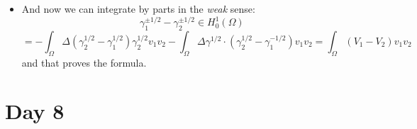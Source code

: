 \documentclass{article}
\begin{document}
\begin{itemize}
\begin{itemize}
        \item And now we can integrate by parts in the \textit{weak} sense:
        \begin{equation}
            \gamma^{\pm 1/2}_1 - \gamma^{\pm1/2}_2 \in H_0^1(\Omega)
        \end{equation}
        \begin{equation}
            = - \int_\Omega \Delta(\gamma^{1/2}_2 - \gamma^{1/2}_1) \gamma^{1/2}_2 v_1v_2 - \int_\Omega \Delta \gamma^{1/2} \cdot (\gamma^{1/2}_2 - \gamma^{-1/2}_1) v_1v_2 = \int_\Omega (V_1 - V_2) v_1 v_2
        \end{equation}
        and that proves the formula.
    \end{itemize}
\end{itemize}


\section*{Day 8}
\end{document}
